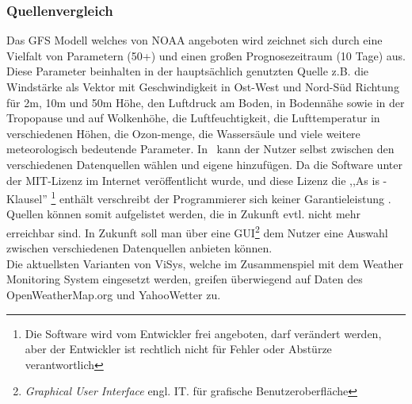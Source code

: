 \subsubsection{Quellenvergleich} %
Das GFS \cite{gfs} Modell welches von NOAA angeboten wird zeichnet
sich durch eine Vielfalt von Parametern (50+) und einen großen Prognosezeitraum (10 Tage) aus.
Diese Parameter beinhalten in der hauptsächlich genutzten Quelle \cite{bspgfs} z.B.
die Windstärke als Vektor mit Geschwindigkeit in Ost-West und Nord-Süd Richtung für 2m, 10m und 50m Höhe, 
den Luftdruck am Boden, in Bodennähe sowie in der Tropopause und auf Wolkenhöhe,
die Luftfeuchtigkeit, die Lufttemperatur in verschiedenen Höhen, die Ozon-menge, die Wassersäule
und viele weitere meteorologisch bedeutende Parameter.
In \vs\ kann der Nutzer selbst zwischen den verschiedenen Datenquellen wählen und eigene hinzufügen.
Da die Software unter der MIT-Lizenz \cite{mitl} im Internet veröffentlicht wurde,
und diese Lizenz die ,,As is - Klausel''
\footnote{Die Software wird vom Entwickler frei angeboten, darf verändert werden,
aber der Entwickler ist rechtlich nicht für Fehler oder Abstürze verantwortlich} enthält verschreibt
der Programmierer sich keiner Garantieleistung \cite{mitl}. Quellen können somit
aufgelistet werden, die in Zukunft evtl. nicht mehr erreichbar sind.
In Zukunft soll man über eine GUI\footnote{\textit{Graphical User Interface} engl. IT.
für grafische Benutzeroberfläche} dem Nutzer eine Auswahl
zwischen verschiedenen Datenquellen anbieten können.\\
Die aktuellsten Varianten von ViSys, welche im Zusammenspiel mit dem Weather Monitoring System
eingesetzt werden, greifen überwiegend auf Daten des OpenWeatherMap.org und YahooWetter zu.

